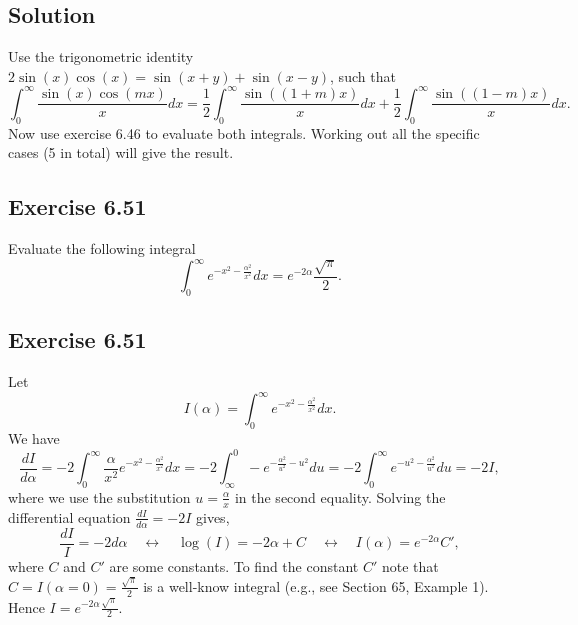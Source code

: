 \subsection*{Solution}

Use the trigonometric identity $2 \sin(x) \cos(x) = \sin(x + y) + \sin(x - y)$, such that
\begin{equation*}
    \int_0^{\infty} \frac{\sin(x) \cos(mx)}{x} dx
        = \frac{1}{2} \int_0^{\infty} \frac{\sin((1 + m)x)}{x} dx + \frac{1}{2} \int_0^{\infty} \frac{\sin((1 - m)x)}{x} dx.
\end{equation*}
Now use exercise 6.46 to evaluate both integrals.
Working out all the specific cases (5 in total) will give the result.


\subsection*{Exercise 6.51}

Evaluate the following integral
\begin{equation*}
    \int_0^{\infty} e^{-x^2 - \frac{\alpha^2}{x^2}} dx = e^{-2\alpha} \frac{\sqrt{\pi}}{2}.
\end{equation*}


\subsection*{Exercise 6.51}

Let
\begin{equation*}
    I(\alpha) = \int_0^{\infty} e^{-x^2 - \frac{\alpha^2}{x^2}} dx.
\end{equation*}
We have
\begin{equation*}
    \frac{dI}{d\alpha}
        = -2 \int_0^{\infty} \frac{\alpha}{x^2} e^{-x^2 - \frac{\alpha^2}{x^2}} dx
        = -2 \int_{\infty}^{0} -e^{-\frac{\alpha^2}{u^2} - u^2} du
        = -2 \int_0^{\infty} e^{-u^2 - \frac{\alpha^2}{u^2}} du
        = -2 I,
\end{equation*}
where we use the substitution $u = \frac{\alpha}{x}$ in the second equality.
Solving the differential equation $\frac{dI}{d\alpha} = -2I$ gives,
\begin{equation*}
    \frac{dI}{I} = -2 d\alpha
        \quad \leftrightarrow \quad \log(I) = -2\alpha + C
        \quad \leftrightarrow \quad I(\alpha) = e^{-2\alpha} C',
\end{equation*}
where $C$ and $C'$ are some constants.
To find the constant $C'$ note that $C = I(\alpha = 0) = \frac{\sqrt{\pi}}{2}$ is a well-know integral (e.g., see Section 65, Example 1).
Hence $I = e^{-2\alpha} \frac{\sqrt{\pi}}{2}$.


